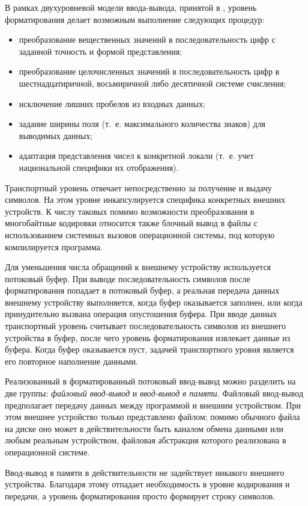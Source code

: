 В рамках двухуровневой модели ввода-вывода, принятой в , 
уровень форматирования делает возможным выполнение следующих
процедур:

\begin{itemize}
\item преобразование вещественных значений в последовательность цифр с заданной точность и формой представления;
\item преобразование целочисленных значений в последовательность цифр в шестнадцатиричной, восьмиричной либо десятичной
системе счисления;
\item исключение лишних пробелов из входных данных;
\item задание ширины поля (т.~е. максимального количества знаков) для выводимых данных;
\item адаптация представления чисел к конкретной локали (т.~е. учет национальной специфики их отображения).
\end{itemize}
Транспортный уровень отвечает непосредственно за получение и выдачу символов. На этом уровне инкапсулируется специфика
конкретных внешних устройств. К числу таковых помимо возможности преобразования в многобайтные кодировки относится
также блочный вывод в файлы с использованием системных вызовов операционной системы, под которую компилируется
программа.

 Для уменьшения числа обращений к внешнему устройству используется потоковый буфер. При выводе последовательность
символов после форматирования попадает в потоковый буфер, а реальная передача данных внешнему устройству выполняется,
когда буфер оказывается заполнен, или когда принудительно вызвана операция опустошения буфера. При вводе данных
транспортный уровень считывает последовательность символов из внешнего устройства в буфер, после чего уровень
форматирования извлекает данные из буфера. Когда буфер оказывается пуст, задачей транспортного уровня является его
повторное наполнение данными.

Реализованный в  форматированный потоковый ввод-вывод можно разделить на две группы: \emph{файловый 
ввод-вывод} и \emph{ввод-вывод в памяти}. Файловый ввод-вывод предполагает передачу данных между
программой и внешним устройством. При этом внешнее устройство только представлено файлом; помимо обычного файла на
диске оно может в действительности быть каналом обмена данными или любым реальным устройством, файловая абстракция
которого реализована в операционной системе. 

Ввод-вывод в памяти в действительности не задействует никакого внешнего устройства. Благодаря этому отпадает
необходимость в уровне кодирования и передачи, а уровень форматирования просто формирует строку символов. 

